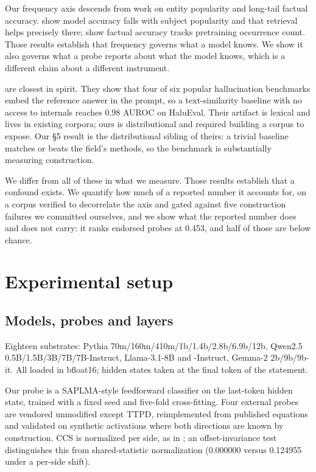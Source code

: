 \documentclass[10pt]{article}
\begin{document}
Our frequency axis descends from work on entity popularity and long-tail factual accuracy. \citet{mallen2023trust} show model accuracy falls with subject popularity and that retrieval helps precisely there; \citet{kandpal2023large} show factual accuracy tracks pretraining occurrence count. Those results establish that frequency governs what a model knows. We show it also governs what a probe reports about what the model knows, which is a different claim about a different instrument.

\citet{hussain2026parallax} are closest in spirit. They show that four of six popular hallucination benchmarks embed the reference answer in the prompt, so a text-similarity baseline with no access to internals reaches 0.98 AUROC on HaluEval. Their artifact is lexical and lives in existing corpora; ours is distributional and required building a corpus to expose. Our §5 result is the distributional sibling of theirs: a trivial baseline matches or beats the field's methods, so the benchmark is substantially measuring construction.

We differ from all of these in what we measure. Those results establish that a confound exists. We quantify how much of a reported number it accounts for, on a corpus verified to decorrelate the axis and gated against five construction failures we committed ourselves, and we show what the reported number does and does not carry: it ranks endorsed probes at 0.453, and half of those are below chance.

\appendix
\section{Experimental setup}

\subsection{Models, probes and layers}

Eighteen substrates: Pythia 70m/160m/410m/1b/1.4b/2.8b/6.9b/12b, Qwen2.5 0.5B/1.5B/3B/7B/7B-Instruct, Llama-3.1-8B and -Instruct, Gemma-2 2b/9b/9b-it. All loaded in bfloat16; hidden states taken at the final token of the statement.

Our probe is a SAPLMA-style feedforward classifier on the last-token hidden state, trained with a fixed seed and five-fold cross-fitting. Four external probes are vendored unmodified except TTPD, reimplemented from published equations and validated on synthetic activations where both directions are known by construction. CCS is normalized per side, as in \citep{burns2023discovering}; an offset-invariance test distinguishes this from shared-statistic normalization (0.000000 versus 0.124955 under a per-side shift).
\end{document}
